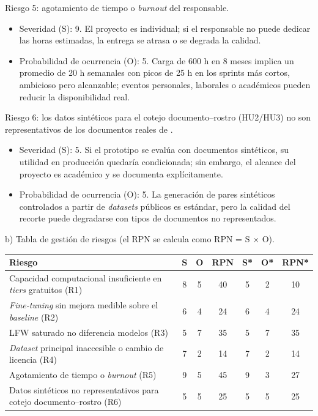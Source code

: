 \documentclass[
  11pt, %
]{charter}
\begin{document}
Riesgo 5: agotamiento de tiempo o \textit{burnout} del responsable.

\begin{itemize}
\item Severidad (S): 9. El proyecto es individual; si el responsable no puede dedicar las horas estimadas, la entrega se atrasa o se degrada la calidad.
\item Probabilidad de ocurrencia (O): 5. Carga de 600 h en 8 meses implica un promedio de 20 h semanales con picos de 25 h en los sprints más cortos, ambicioso pero alcanzable; eventos personales, laborales o académicos pueden reducir la disponibilidad real.
\end{itemize}

Riesgo 6: los datos sintéticos para el cotejo documento--rostro (HU2/HU3) no son representativos de los documentos reales de \empclientename.

\begin{itemize}
\item Severidad (S): 5. Si el prototipo se evalúa con documentos sintéticos, su utilidad en producción quedaría condicionada; sin embargo, el alcance del proyecto es académico y se documenta explícitamente.
\item Probabilidad de ocurrencia (O): 5. La generación de pares sintéticos controlados a partir de \textit{datasets} públicos es estándar, pero la calidad del recorte puede degradarse con tipos de documentos no representados.
\end{itemize}

b) Tabla de gestión de riesgos (el RPN se calcula como RPN = S $\times$ O).

\begin{table}[htpb]
\centering
\begin{tabularx}{\linewidth}{@{}|X|c|c|c|c|c|c|@{}}
\hline
\rowcolor[HTML]{C0C0C0}
Riesgo & S & O & RPN & S* & O* & RPN* \\ \hline
Capacidad computacional insuficiente en \textit{tiers} gratuitos (R1) & 8 & 5 & 40 & 5 & 2 & 10 \\ \hline
\textit{Fine-tuning} sin mejora medible sobre el \textit{baseline} (R2) & 6 & 4 & 24 & 6 & 4 & 24 \\ \hline
LFW saturado no diferencia modelos (R3) & 5 & 7 & 35 & 5 & 7 & 35 \\ \hline
\textit{Dataset} principal inaccesible o cambio de licencia (R4) & 7 & 2 & 14 & 7 & 2 & 14 \\ \hline
Agotamiento de tiempo o \textit{burnout} (R5) & 9 & 5 & 45 & 9 & 3 & 27 \\ \hline
Datos sintéticos no representativos para cotejo documento--rostro (R6) & 5 & 5 & 25 & 5 & 5 & 25 \\ \hline
\end{tabularx}%
\end{table}
\end{document}
